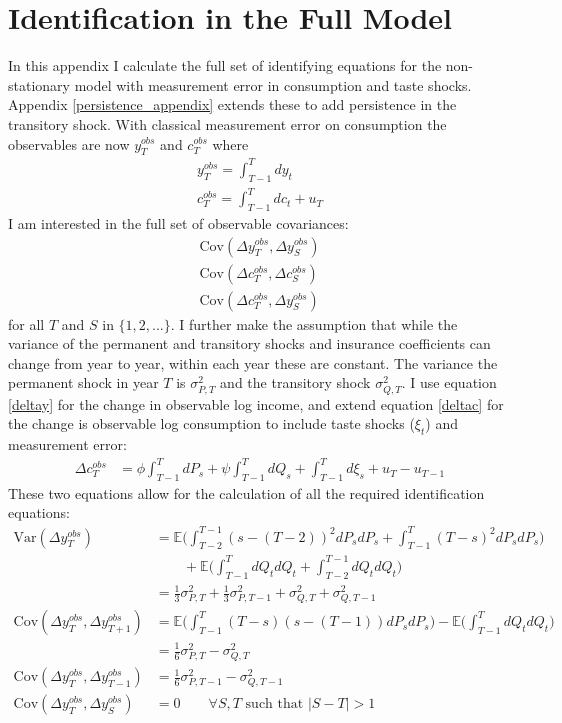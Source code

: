 \section{Identification in the Full Model} \label{identification}
In this appendix I calculate the full set of identifying equations for the non-stationary model with measurement error in consumption and taste shocks. Appendix \ref{persistence_appendix} extends these to add persistence in the transitory shock. With classical measurement error on consumption the observables are now $y^{obs}_T$ and $c^{obs}_T$ where
\begin{align*}
y^{obs}_T = \int_{T-1}^{T} dy_t \\
c^{obs}_T = \int_{T-1}^{T} dc_t + u_T
\end{align*}
I am interested in the full set of observable covariances:
\begin{align*}
\mathrm{Cov}(\Delta y^{obs}_T, \Delta y^{obs}_S) \\
\mathrm{Cov}(\Delta c^{obs}_T, \Delta c^{obs}_S) \\
\mathrm{Cov}(\Delta c^{obs}_T,  \Delta y^{obs}_S)
\end{align*}
for all $T$ and $S$ in $\{1,2,...\}$. I further make the assumption that while the variance of the permanent and transitory shocks and insurance coefficients can change from year to year, within each year these are constant. The variance the permanent shock in year $T$ is $\sigma^2_{P,T}$ and the transitory shock $\sigma^2_{Q,T}$. I use equation \ref{deltay} for the change in observable log income, and extend equation \ref{deltac} for the change is observable log consumption to include taste shocks ($\xi_t$) and measurement error:
\begin{align}
\Delta c^{obs}_T &= \phi  \int_{T-1}^{T} dP_s  +\psi \int_{T-1}^{T}dQ_s +\int_{T-1}^{T}d\xi_s  + u_T - u_{T-1} \nonumber
\end{align}
These two equations allow for the calculation of all the required identification equations:
\begin{align}
\mathrm{Var}(\Delta y^{obs}_T) &= \mathbb{E} \Big(\int_{T-2}^{T-1} (s-(T-2))^2 dP_s dP_s  + \int_{T-1}^{T} (T-s)^2 dP_s dP_s \Big) \nonumber \\
& \qquad + \mathbb{E} \Big(\int_{T-1}^{T} dQ_t dQ_t +\int_{T-2}^{T-1} dQ_t dQ_t \Big) \nonumber \\
&= \frac{1}{3} \sigma^2_{P,T} + \frac{1}{3} \sigma^2_{P,T-1} +  \sigma^2_{Q,T} +  \sigma^2_{Q,T-1} \label{inc_var_indentification}\\
\mathrm{Cov}(\Delta y^{obs}_T, \Delta y^{obs}_{T+1}) &=  \mathbb{E} \Big(\int_{T-1}^{T} (T-s)(s-(T-1)) dP_s dP_s  \Big) - \mathbb{E} \Big(\int_{T-1}^{T} dQ_t dQ_t \Big) \nonumber \\
&= \frac{1}{6}\sigma^2_{P,T} - \sigma^2_{Q,T} \\
\mathrm{Cov}(\Delta y^{obs}_T, \Delta y^{obs}_{T-1}) &= \frac{1}{6}\sigma^2_{P,T-1} - \sigma^2_{Q,T-1} \\
\mathrm{Cov}(\Delta y^{obs}_T, \Delta y^{obs}_{S}) &= 0 \qquad \forall S,T \text{ such that }|S-T| >1 
\end{align}
